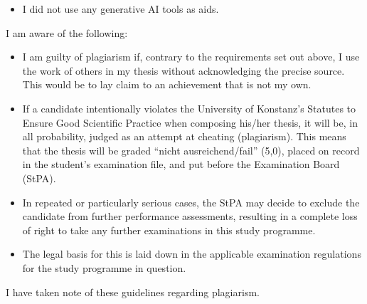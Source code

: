 {\begin{itemize}
        
    \item[\mbox{\begin{Form}\CheckBox[height=0.2cm, width=0.2cm]{}\end{Form}}]I did not use any generative AI tools as aids.
\end{itemize}





\thispagestyle{page2}

I am aware of the following:

\begin{itemize}[label=\color{kon4}---]
\item I am guilty of plagiarism if, contrary to the requirements set out above, I use the work of others in my thesis without acknowledging the precise source. This would be to lay claim to an achievement that is not my own.

\item If a candidate intentionally violates the University of Konstanz's Statutes to Ensure Good Scientific Practice when composing his/her thesis, it will be, in all probability, judged as an attempt at cheating (plagiarism). This means that the thesis will be graded \enquote{nicht ausreichend/fail} (5,0), placed on record in the student's examination file, and put before the Examination Board (StPA).

\item In repeated or particularly serious cases, the StPA may decide to exclude the candidate from further performance assessments, resulting in a complete loss of right to take any further examinations in this study programme.

\item The legal basis for this is laid down in the applicable examination regulations for the study programme in question.
\end{itemize}

I have taken note of these guidelines regarding plagiarism.

\vspace{0.75cm}

}
